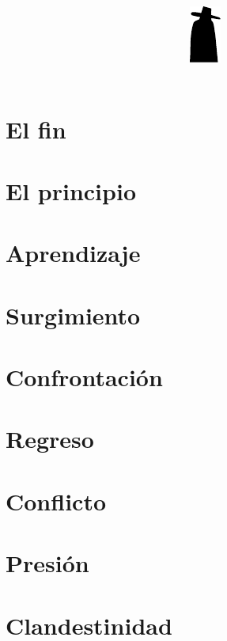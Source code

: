 \documentclass[11pt]{book}
\title{\textbf{\Huge\titlename}\\\bigskip\includegraphics{images/minicaido.pdf}\vspace{-2\bigskipamount}\setcounter{page}{3}}
\author{\textit{\authorname}}
\date{}
\begin{document}
\pagestyle{empty}
\hbox{}\cleardoublepage
\maketitle

\newpage\hbox{}\cleardoublepage

\pagestyle{fancyplain}
\chapter{El fin}


\chapter{El principio}


\chapter{Aprendizaje}


\chapter{Surgimiento}


\chapter{Confrontación}


\chapter{Regreso}


\chapter{Conflicto}


\chapter{Presión}


\chapter{Clandestinidad}

\end{document}
